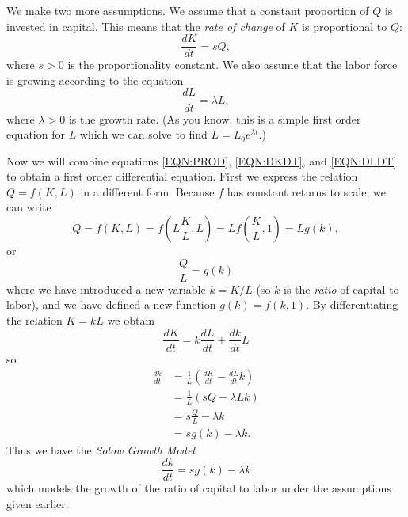 \documentclass{book}
\begin{document}
We make two more assumptions.
We assume that a constant proportion of $Q$ is invested in capital.
This means that the \emph{rate of change} of $K$ is proportional to
$Q$:
\begin{equation}
    \frac{dK}{dt} = s Q,
\label{EQN:DKDT}
\end{equation}
where $s > 0$ is the proportionality constant.
We also assume that the labor force is growing according
to the equation
\begin{equation}
   \frac{dL}{dt} = \lambda L,
   \label{EQN:DLDT}
\end{equation}
where $\lambda > 0$ is the growth rate.  (As you know, this is a simple
first order equation for $L$ which we can solve to find 
$L = L_0 e^{\lambda t}$.)

Now we will combine equations \eqref{EQN:PROD}, \eqref{EQN:DKDT},
and \eqref{EQN:DLDT} to obtain a first order differential equation.
First we express the relation $Q=f(K,L)$ in a different form.
Because $f$ has constant returns to scale, we can write
\begin{equation}
   Q = f(K,L) = f\left(L\frac{K}{L},L\right) 
        = Lf\left(\frac{K}{L},1\right) = Lg(k),
   \label{EQN:QG}
\end{equation}
or
\begin{equation}
  \frac{Q}{L} = g(k)
\end{equation}
where we have introduced a new variable $k = K/L$
(so $k$ is the \emph{ratio} of capital to labor),
and we have defined a new function $g(k) = f(k,1)$.
By differentiating the relation $K = kL$ we obtain
\begin{equation}
   \frac{dK}{dt}  = k\frac{dL}{dt} + \frac{dk}{dt} L
\end{equation}
so
\begin{equation}
\begin{split}
   \frac{dk}{dt} & = \frac{1}{L} \left(\frac{dK}{dt} - \frac{dL}{dt} k\right) \\
                    & = \frac{1}{L} \left( sQ - \lambda L k \right) \\
                    & = s \frac{Q}{L} - \lambda k \\
                    & = s g(k) - \lambda k .
\end{split}
\end{equation}
Thus we have the \emph{Solow Growth Model} \cite{Solow}
\begin{equation}
  \frac{dk}{dt} = s g(k) - \lambda k
\end{equation}
which models the growth of the ratio of capital to labor
under the assumptions given earlier.
\end{document}
